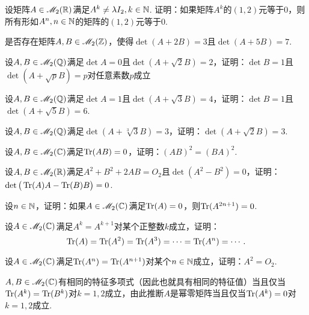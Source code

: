 \begin{problem}
  设矩阵$A\in\mathscr M_2(\mathbb R)$满足$A^k\ne\lambda I_2,k\in\mathbb N$. 证明：如果矩阵$A^k$的$(1,2)$元等于0，则所有形如$A^n,n\in\mathbb N$的矩阵的$(1,2)$元等于0.
\end{problem}

\begin{problem}
  是否存在矩阵$A,B\in\mathscr M_2(\mathbb Z)$，使得$\det(A+2B)=3$且$\det(A+5B)=7$.
\end{problem}

\begin{problem}
  设$A,B\in\mathscr M_2(\mathbb Q)$满足$\det A=0$且$\det(A+\sqrt2B)=2$，证明：$\det B=1$且$\det(A+\sqrt pB)=p$对任意素数$p$成立
\end{problem}

\begin{problem}
  设$A,B\in\mathscr M_2(\mathbb Q)$满足$\det A=1$且$\det(A+\sqrt3B)=4$，证明：$\det B=1$且$\det(A+\sqrt5B)=6$.
\end{problem}

\begin{problem}
  设$A,B\in\mathscr M_2(\mathbb Q)$满足$\det(A+\sqrt[3]3B)=3$，证明：$\det(A+\sqrt2B)=3$.
\end{problem}

\begin{problem}
  设$A,B\in\mathscr M_2(\mathbb C)$满足$\operatorname{Tr}(AB)=0$，证明：$(AB)^2=(BA)^2$.
\end{problem}

\begin{problem}
  设$A,B\in\mathscr M_2(\mathbb R)$满足$A^2+B^2+2AB=O_2$且$\det(A^2-B^2)=0$，证明：$\det\big(\operatorname{Tr}(A)A-\operatorname{Tr}(B)B\big)=0$.
\end{problem}

\begin{problem}
  设$n\in\mathbb N$，证明：如果$A\in\mathscr M_2(\mathbb C)$满足$\operatorname{Tr}(A)=0$，则$\operatorname{Tr}(A^{2n+1})=0$.
\end{problem}

\begin{problem}
  设$A\in\mathscr M_2(\mathbb C)$满足$A^k=A^{k+1}$对某个正整数$k$成立，证明：
  \[
    \operatorname{Tr}(A) = \operatorname{Tr}(A^2) = \operatorname{Tr}(A^3) = \cdots = \operatorname{Tr}(A^n) = \cdots.
  \]
\end{problem}

\begin{problem}
  设$A\in\mathscr M_2(\mathbb C)$满足$\operatorname{Tr}(A^n)=\operatorname{Tr}(A^{n+1})$对某个$n\in\mathbb N$成立，证明：$A^2=O_2$.
\end{problem}

\begin{problem}
  $A,B\in\mathscr M_2(\mathbb C)$有相同的特征多项式（因此也就具有相同的特征值）当且仅当$\operatorname{Tr}(A^k)=\operatorname{Tr}(B^k)$对$k=1,2$成立，由此推断$A$是幂零矩阵当且仅当$\operatorname{Tr}(A^k)=0$对$k=1,2$成立.
\end{problem}


